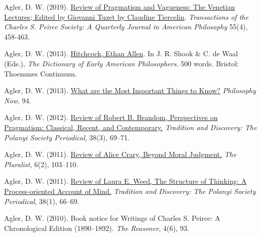 \documentclass[p1noheader, 11pt]{../lightcv}
\begin{document}
\begin{rlist}
\item Agler, D. W. (2019). \href{https://muse.jhu.edu/pub/3/article/751300}{Review of Pragmatism and Vagueness: The Venetian Lectures; Edited by Giovanni Tuzet by Claudine Tiercelin}. \textit{Transactions of the Charles S. Peirce Society: A Quarterly Journal in American Philosophy} 55(4), 458-463.
\item Agler, D. W. (2013). \href{https://www.oxfordreference.com/display/10.1093/acref/9780199797745.001.0001/acref-9780199797745-e-0204?rskey=R3wQuA&result=7}{Hitchcock, Ethan Allen}. In J. R. Shook \& C. de Waal (Eds.), \textit{The Dictionary of Early American Philosophers}. 500 words. Bristol: Thoemmes Continuum.
\item Agler, D. W. (2013). \href{https://philosophynow.org/issues/94/What_Are_The_Most_Important_Things_To_Know}{What are the Most Important Things to Know?} \textit{Philosophy Now}, 94.
\item Agler, D. W. (2012). \href{https://philpapers.org/rec/AGLPOP-2}{Review of Robert B. Brandom, Perspectives on Pragmatism: Classical, Recent, and Contemporary.} \textit{Tradition and Discovery: The Polanyi Society Periodical}, 38(3), 69–71.
\item Agler, D. W. (2011). \href{https://philpapers.org/rec/AGLBMJ-2}{Review of Alice Crary, Beyond Moral Judgment.} \textit{The Pluralist}, 6(2), 103–110.
\item Agler, D. W. (2011). \href{https://doi.org/10.5840/traddisc2011/201238115}{Review of Laura E. Weed, The Structure of Thinking: A Process-oriented Account of Mind.} \textit{Tradition and Discovery: The Polanyi Society Periodical}, 38(1), 66–69.
\item Agler, D. W. (2010). Book notice for Writings of Charles S. Peirce: A Chronological Edition (1890–1892). \textit{The Reasoner}, 4(6), 93.
\end{rlist}
\end{document}

